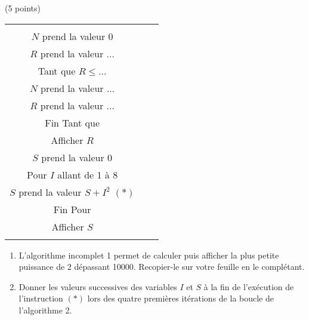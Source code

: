 \documentclass[a4paper,11pt]{article}
\theoremstyle{break}
\begin{document}
   \begin{exo}(5 points)
   
      \begin{tabular}{c|c c}
  \begin{minipage}[b]{0.47\textwidth}
  
  Algorithme 1 \\

   $N$ prend la valeur 0\\
   
   $R$ prend la valeur ...\\
   
   Tant que $R \leq $...\\
   
   $N$ prend la valeur ...\\
   
   $R$ prend la valeur ...\\ 
   
   Fin Tant que \\
   
   Afficher $R$

  \end{minipage}
  &
&
  \begin{minipage}[b]{0.47\textwidth}
   
   Algorithme 2\\
 
 $S$ prend la valeur 0\\
 
 Pour $I$ allant de 1 à 8\\
 
 $S$ prend la valeur $S+I^2$ $(*)$\\
 
 Fin Pour\\
 
 Afficher $S$\\
 
\vspace{1.5cm}


  \end{minipage}

  \end{tabular}
  
  \begin{enumerate}
   \item L'algorithme incomplet 1 permet de calculer puis afficher
   la plus petite puissance de 2 dépassant 10000.
   Recopier-le sur votre feuille en le complétant.
   
      \item Donner les valeurs successives des variables $I$ et $S$ à la fin de 
   l'exécution de l'instruction $(*)$ lors des quatre premières itérations de la boucle de 
   l'algorithme 2.
 

\end{enumerate}
\end{exo}
\end{document}
